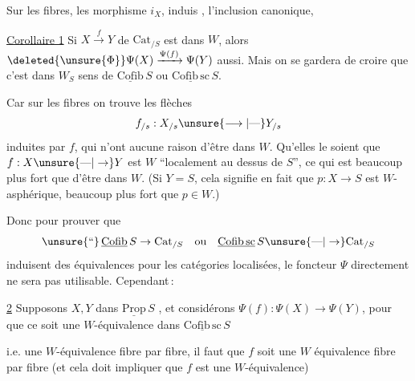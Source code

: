 Sur les fibres, les morphisme $i_X$,  induis 
,  l'inclusion canonique, 


\uline{Corollaire 1} Si $X\xrightarrow{f}Y$ de $\mathrm{Cat}_{/S}$ est dans $W$, alors $\deleted{\unsure{\Phi}}\Psi(X)\xrightarrow{\Psi(f)}\Psi(Y)$ aussi. Mais on se gardera de croire que c'est dans $W_S$  sens de $\underline{\mathrm{Cofib}}\,S$ ou $\underline{\mathrm{Cofib}\,\mathrm{sc}}\,S$.

Car sur les fibres   on trouve les flèches
\[ f_{/s}:X_{/s}\unsure{\longrightarrow|\text{---}}Y_{/s} \]
induites par $f$, qui n'ont aucune raison d'être dans $W$. Qu'elles le soient  que $f:X\unsure{\text{---}|\to}Y$ est  $W$ ``localement au dessus de $S$'', ce qui  est beaucoup plus fort que d'être dans $W$. (Si $Y=S$, cela signifie en fait que $p:X\to S$ est $W$-asphérique, beaucoup plus fort que  $p\in W$.)

Donc \deleted{$\unsure{\Psi}$} pour prouver que
\[ \unsure{\text{``}}\,\underline{\mathrm{Cofib}}\,S\to\mathrm{Cat}_{/S}\quad\text{ou}\quad \underline{\mathrm{Cofib}\,\mathrm{sc}}\,S\unsure{\text{---}|\to}\mathrm{Cat}_{/S} \]
induisent des équivalences pour les catégories localisées, le foncteur $\Psi$ directement ne  sera pas utilisable. Cependant\,:

\uline{ 2} Supposons $X,Y$ dans $\underline{\mathrm{Prop}}\,S$ , et considérons $\Psi(f):\Psi(X)\to\Psi(Y)$, pour que ce soit une $W$-équivalence dans $\underline{\mathrm{Cofib}\,\mathrm{sc}}\,S$ 


i.e. une $W$-équivalence fibre par fibre, il faut  que $f$ soit une $W$ équivalence fibre par fibre (et cela doit impliquer  que $f$ est une $W$-équivalence)

